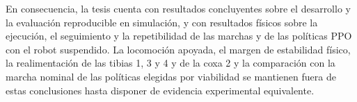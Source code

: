 En consecuencia, la tesis cuenta con resultados concluyentes sobre el
desarrollo y la evaluación reproducible en simulación, y con resultados
físicos sobre la ejecución, el seguimiento y la repetibilidad de las marchas y de
las políticas PPO con el robot suspendido. La locomoción apoyada, el margen de
estabilidad físico, la realimentación de las tibias 1, 3 y 4 y de la coxa 2 y la
comparación con la marcha nominal de las políticas elegidas por viabilidad se
mantienen fuera de estas conclusiones hasta disponer de evidencia experimental
equivalente.
